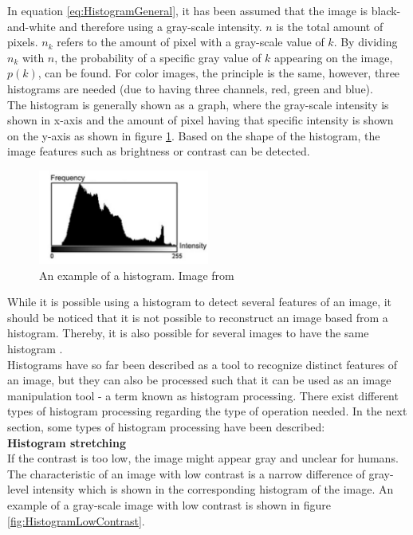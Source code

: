 In equation \ref{eq:HistogramGeneral}, it has been assumed that the image is black-and-white and therefore using a gray-scale intensity. $n$ is the total amount of pixels. $n_k$ refers to the amount of pixel with a gray-scale value of $k$. By dividing $n_k$ with $n$, the probability of a specific gray value of $k$ appearing on the image, $p(k)$, can be found. For color images, the principle is the same, however, three histograms are needed (due to having three channels, red, green and blue). \\

The histogram is generally shown as a graph, where the gray-scale intensity is shown in x-axis and the amount of pixel having that specific intensity is shown on the y-axis as shown in figure \ref{fig:HistogramEx}. Based on the shape of the histogram, the image features such as brightness or contrast can be detected. \\

\begin{figure}[H]
	\centering
	\includegraphics[width=0.5\textwidth]{8Misc/Pictures/Introduction/histogram_example.jpg}
	\caption{An example of a histogram. Image from \citep[ Chapter~4.3]{book:Moeslund}}
	\label{fig:HistogramEx}
\end{figure}

While it is possible using a histogram to detect several features of an image, it should be noticed that it is not possible to reconstruct an image based from a histogram. Thereby, it is also possible for several images to have the same histogram \citep{book:Moeslund}. \\

Histograms have so far been described as a tool to recognize distinct features of an image, but they can also be processed such that it can be used as an image manipulation tool - a term known as histogram processing. There exist different types of histogram processing regarding the type of operation needed. In the next section, some types of histogram processing have been described: \\

\textbf{Histogram stretching} \\
If the contrast is too low, the image might appear gray and unclear for humans. The characteristic of an image with low contrast is a narrow difference of gray-level intensity which is shown in the corresponding histogram of the image. An example of a gray-scale image with low contrast is shown in figure \ref{fig:HistogramLowContrast}. 

